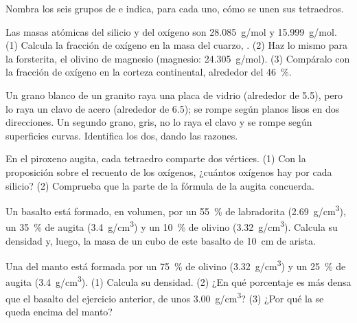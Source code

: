\begin{exercise}[$\star$]\label{exo:g11:minerals:5}
Nombra los seis grupos de  e indica, para cada
uno, cómo se unen sus tetraedros.
\end{exercise}

\begin{exercise}[$\star\star$]\label{exo:g11:minerals:6}
Las masas atómicas del silicio y del oxígeno son \qty{28.085}{g/mol} y
\qty{15.999}{g/mol}. (1) Calcula la fracción de oxígeno en la masa del cuarzo,
. (2) Haz lo mismo para la forsterita, el olivino de magnesio
 (magnesio: \qty{24.305}{g/mol}). (3) Compáralo con la fracción
de oxígeno en la corteza continental, alrededor del \qty{46}{\percent}.
\end{exercise}

\begin{exercise}[$\star\star$]\label{exo:g11:minerals:7}
Un grano blanco de un granito raya una placa de vidrio (alrededor de 5.5),
pero lo raya un clavo de acero (alrededor de 6.5); se rompe según planos lisos
en dos direcciones. Un segundo grano, gris, no lo raya el clavo y se rompe
según superficies curvas. Identifica los dos, dando las razones.
\end{exercise}

\begin{exercise}[$\star\star$]\label{exo:g11:minerals:8}
En el piroxeno augita, cada tetraedro comparte dos vértices. (1) Con la
proposición sobre el recuento de los oxígenos, ¿cuántos oxígenos hay por cada
silicio? (2) Comprueba que la parte  de la fórmula de la augita
concuerda.
\end{exercise}

\begin{exercise}[$\star\star$]\label{exo:g11:minerals:9}
Un basalto está formado, en volumen, por un \qty{55}{\percent} de
labradorita (\qty{2.69}{g/cm^3}), un \qty{35}{\percent} de augita
(\qty{3.4}{g/cm^3}) y un \qty{10}{\percent} de olivino (\qty{3.32}{g/cm^3}).
Calcula su densidad y, luego, la masa de un cubo de este basalto de
\qty{10}{cm} de arista.
\end{exercise}

\begin{exercise}[$\star\star$]\label{exo:g11:minerals:10}
Una  del manto está formada por un \qty{75}{\percent} de olivino
(\qty{3.32}{g/cm^3}) y un \qty{25}{\percent} de augita (\qty{3.4}{g/cm^3}).
(1) Calcula su densidad. (2) ¿En qué porcentaje es más densa que el basalto
del ejercicio anterior, de unos \qty{3.00}{g/cm^3}? (3) ¿Por qué la  se queda encima del manto?
\end{exercise}

